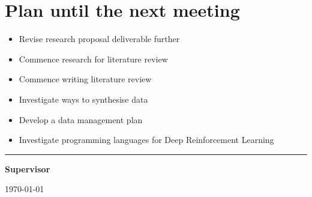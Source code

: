 \documentclass[12pt]{article}
\begin{document}
	\section{Plan until the next meeting}
	\begin{itemize}
		\item Revise research proposal deliverable further
		
		\item Commence research for literature review
		
		\item Commence writing literature review
		
		\item Investigate ways to synthesise data
		
		\item Develop a data management plan
		
		\item Investigate programming languages for Deep Reinforcement Learning
		
	\end{itemize}
	
	\par
	\vspace{\fill}
	\noindent\rule{0.4\linewidth}{0.5pt}%
	\vspace{1em}%
	\par
	\noindent\textbf{Supervisor}\vspace{1em}%
	\par
	\noindent\today
\end{document}
